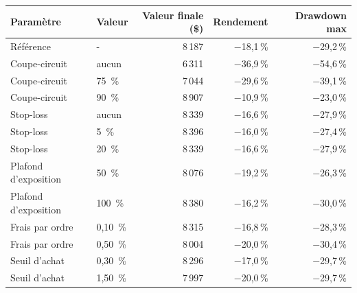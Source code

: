 \begin{tabular}{llrrr}\toprule
Paramètre & Valeur & Valeur finale (\$) & Rendement & Drawdown max \\\midrule
Référence & - & 8\,187 & $-$18,1\,\% & $-$29,2\,\% \\
Coupe-circuit & aucun & 6\,311 & $-$36,9\,\% & $-$54,6\,\% \\
Coupe-circuit & 75 \,\% & 7\,044 & $-$29,6\,\% & $-$39,1\,\% \\
Coupe-circuit & 90 \,\% & 8\,907 & $-$10,9\,\% & $-$23,0\,\% \\
Stop-loss & aucun & 8\,339 & $-$16,6\,\% & $-$27,9\,\% \\
Stop-loss & 5 \,\% & 8\,396 & $-$16,0\,\% & $-$27,4\,\% \\
Stop-loss & 20 \,\% & 8\,339 & $-$16,6\,\% & $-$27,9\,\% \\
Plafond d'exposition & 50 \,\% & 8\,076 & $-$19,2\,\% & $-$26,3\,\% \\
Plafond d'exposition & 100 \,\% & 8\,380 & $-$16,2\,\% & $-$30,0\,\% \\
Frais par ordre & 0,10 \,\% & 8\,315 & $-$16,8\,\% & $-$28,3\,\% \\
Frais par ordre & 0,50 \,\% & 8\,004 & $-$20,0\,\% & $-$30,4\,\% \\
Seuil d'achat & 0,30 \,\% & 8\,296 & $-$17,0\,\% & $-$29,7\,\% \\
Seuil d'achat & 1,50 \,\% & 7\,997 & $-$20,0\,\% & $-$29,7\,\% \\
\bottomrule\end{tabular}
